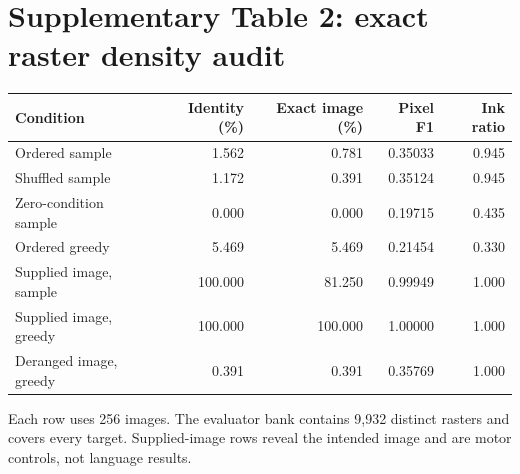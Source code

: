 \section*{Supplementary Table 2: exact raster density audit}
\begin{center}\begin{tabular}{lrrrr}\toprule
Condition & Identity (\%) & Exact image (\%) & Pixel F1 & Ink ratio \\
\midrule
Ordered sample & 1.562 & 0.781 & 0.35033 & 0.945 \\
Shuffled sample & 1.172 & 0.391 & 0.35124 & 0.945 \\
Zero-condition sample & 0.000 & 0.000 & 0.19715 & 0.435 \\
Ordered greedy & 5.469 & 5.469 & 0.21454 & 0.330 \\
Supplied image, sample & 100.000 & 81.250 & 0.99949 & 1.000 \\
Supplied image, greedy & 100.000 & 100.000 & 1.00000 & 1.000 \\
Deranged image, greedy & 0.391 & 0.391 & 0.35769 & 1.000 \\
\bottomrule\end{tabular}\end{center}
Each row uses 256 images. The evaluator bank contains 9,932 distinct rasters and covers every target. Supplied-image rows reveal the intended image and are motor controls, not language results.
